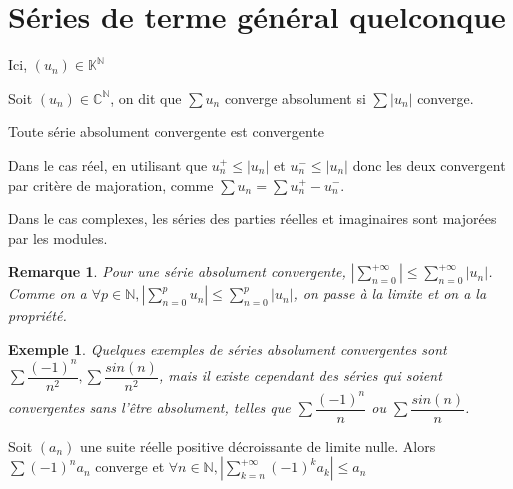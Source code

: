 \documentclass[a4paper,12pt]{book}
\newcommand{\Def}[2]{\begin{tcolorbox}[sharp corners, colback=white,colframe=blue!90!black!75, title=Définition : #1]#2\end{tcolorbox}}
\newcommand{\Thr}[2]{\begin{tcolorbox}[sharp corners, colback=white,colframe=red!90!black!75, title=Théorème : #1]#2\end{tcolorbox}}
\newcommand{\Pre}[1]{\begin{tcolorbox}[sharp corners, colback=white,colframe=green!60!green!30!black!75, title=Preuve]#1\end{tcolorbox}}
\newtheorem{Exe}{Exemple}[section]
\newtheorem{Rem}{Remarque}[section]
\def\C{\mathbb{C}}
\def\N{\mathbb{N}}
\def\K{\mathbb{K}}
\begin{document}
\section{Séries de terme général quelconque}
Ici, $(u_n)\in\K^\N$
\Def{Absolue convergence}{Soit $(u_n)\in\C^\N$, on dit que $\sum u_n$ converge absolument si $\sum \vert u_n\vert$ converge.}
\Thr{Conséquences de l'absolue convergence}{Toute série absolument convergente est convergente}
\Pre{Dans le cas réel, en utilisant que $u_n^+\leq\vert u_n\vert$ et $u_n^-\leq\vert u_n\vert$ donc les deux convergent par critère de majoration, comme $\sum u_n = \sum u_n^+ - u_n^-$.
\par Dans le cas complexes, les séries des parties réelles et imaginaires sont majorées par les modules.}
\begin{Rem}
Pour une série absolument convergente, $\left|\sum\limits_{n=0}^{+\infty}\right| \leq \sum\limits_{n=0}^{+\infty}\vert u_n\vert$. Comme on a $\forall p\in\N, \left|\sum\limits_{n=0}^pu_n\right|\leq \sum\limits_{n=0}^p\vert u_n\vert$, on passe à la limite et on a la propriété.
\end{Rem}
\begin{Exe}
Quelques exemples de séries absolument convergentes sont $\sum \dfrac{(-1)^n}{n^2}, \sum \dfrac{sin(n)}{n^2}$, mais il existe cependant des séries qui soient convergentes sans l'être absolument, telles que $\sum \dfrac{(-1)^n}{n}$ ou $\sum \dfrac{sin(n)}{n}$.
\end{Exe}
\Thr{Théorème spécial des séries alternées}{Soit $(a_n)$ une suite réelle positive décroissante de limite nulle. Alors $\sum(-1)^n a_n$ converge et $\forall n\in\N, \left|\sum\limits_{k=n}^{+\infty}(-1)^ka_k\right|\leq a_n$}
\end{document}
